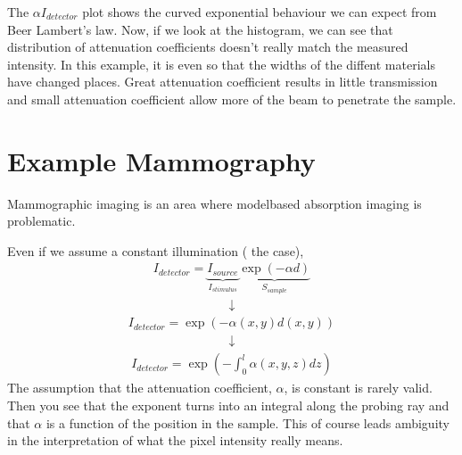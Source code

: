 \documentclass[letterpaper,10pt,english]{sphinxmanual}
\begin{document}
\noindent{}

\sphinxAtStartPar
The \(\alpha\)\sphinxhyphen{}\(I_{detector}\) plot shows the curved exponential behaviour we can expect from Beer Lambert’s law. Now, if we look at the histogram, we can see that distribution of attenuation coefficients doesn’t really match the measured intensity. In this example, it is even so that the widths of the diffent materials have changed places. Great attenuation coefficient results in little transmission and small attenuation coefficient allow more of the beam to penetrate the sample.


\chapter{Example Mammography}
\label{\detokenize{04-BasicSegmentation:example-mammography}}
\sphinxAtStartPar
Mammographic imaging is an area where model\sphinxhyphen{}based absorption imaging is problematic.

\sphinxAtStartPar
Even if we assume a constant illumination ( the case),
\begin{equation*}
\begin{split}I_{detector}=\underbrace{I_{source}}_{I_{stimulus}}\underbrace{\exp(-\alpha d)}_{S_{sample}}\end{split}
\end{equation*}\begin{equation*}
\begin{split}\downarrow\end{split}
\end{equation*}\begin{equation*}
\begin{split}I_{detector}=\exp(-\alpha(x,y) d(x,y))\end{split}
\end{equation*}\begin{equation*}
\begin{split}\downarrow\end{split}
\end{equation*}\begin{equation*}
\begin{split}I_{detector}=\exp\left(-\int_{0}^{l}\alpha(x,y, z) dz\right)\end{split}
\end{equation*}
\sphinxAtStartPar
The assumption that the attenuation coefficient, \(\alpha\), is constant is rarely valid. Then you see that the exponent turns into an integral along the probing ray and that \(\alpha\) is a function of the position in the sample. This of course leads ambiguity in the interpretation of what the pixel intensity really means.
\end{document}
